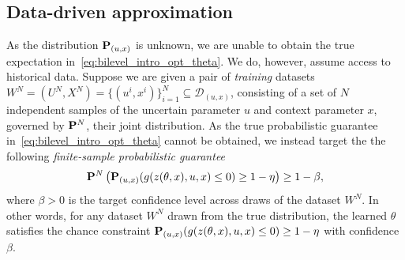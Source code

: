 \subsection{Data-driven approximation}
\label{ssec:constrained_learning}
As the distribution ${\mathbf P}_{(u,x)}$ is unknown, we are unable to obtain the true expectation in~\eqref{eq:bilevel_intro_opt_theta}. We do, however, assume access to historical data.
Suppose we are given
a pair of {\it training} datasets $W^{N} = (U^N,X^N) = \{(u^i,x^i)\}_{i=1}^N \subseteq \mathcal{D}_{(u,x)}$, consisting of a set of $N$ independent samples of the uncertain parameter $u$ and context parameter $x$, governed by ${\mathbf P}^N$, their joint distribution.
As the true probabilistic guarantee in~\eqref{eq:bilevel_intro_opt_theta} cannot be obtained, we instead target the
the following {\it finite-sample probabilistic guarantee}
\begin{equation}
  \label{eq:prob_guarantee}
  {\mathbf P}^{N}\left({\mathbf P}_{(u,x)}(g(z(\theta,x),u,x) \le 0) \ge 1 - \eta\right)\geq 1 - \beta,
\end{equation}
where $\beta > 0$ is the target confidence level across draws of the dataset $W^N$.
In other words, for any dataset $W^N$ drawn from the true distribution, the learned $\theta$ satisfies the chance constraint ${\mathbf P}_{(u,x)}(g(z(\theta,x),u,x) \le 0) \ge 1 - \eta$ with confidence $\beta$.
